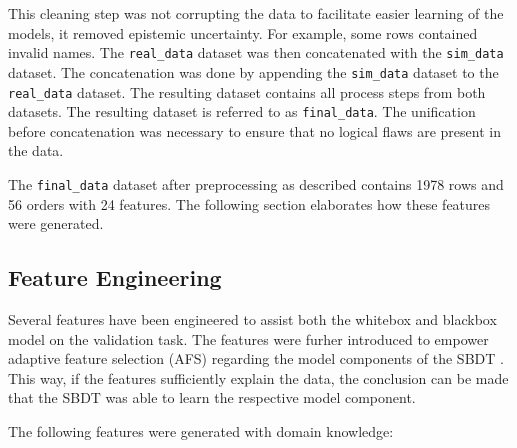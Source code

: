 This cleaning step was not corrupting the data to facilitate easier learning of the models, it removed epistemic uncertainty. For example, some rows contained invalid names.
The \texttt{real\_data} dataset was then concatenated with the \texttt{sim\_data} dataset. The concatenation was done by appending the \texttt{sim\_data} dataset to the \texttt{real\_data} dataset. The resulting dataset contains all process steps from both datasets. The resulting dataset is referred to as \texttt{final\_data}. The unification before concatenation was necessary to ensure that no logical flaws are present in the data.

The \texttt{final\_data} dataset after preprocessing as described contains 1978 rows and 56 orders with 24 features. The following section elaborates how these features were generated.

\subsection*{Feature Engineering}
\label{sec:feature-engineering}

Several features have been engineered to assist both the whitebox and blackbox model on the validation task. The features were furher introduced to empower adaptive feature selection (AFS) regarding the model components of the SBDT \autocite{schwede2024learning}. This way, if the features sufficiently explain the data, the conclusion can be made that the SBDT was able to learn the respective model component.

The following features were generated with domain knowledge:

